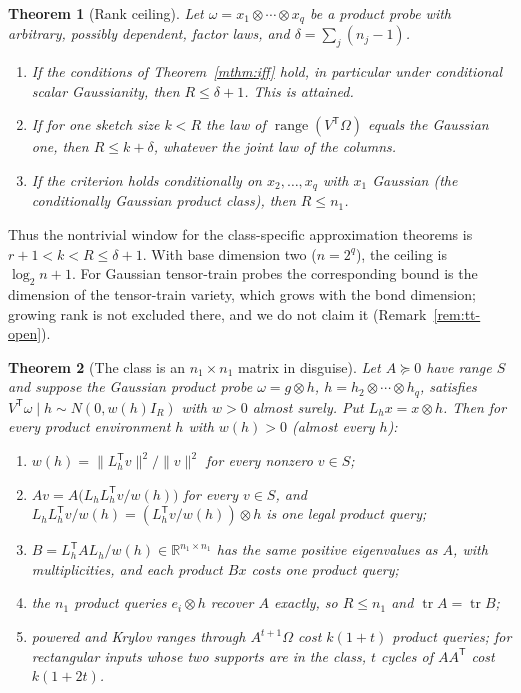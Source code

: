 \documentclass[11pt,a4paper]{article}
\newtheorem{mainthm}{Theorem}
\theoremstyle{definition}
\theoremstyle{remark}
\numberwithin{equation}{section}
\newcommand{\R}{\mathbb R}
\newcommand{\T}{{\mathsf T}}
\newcommand{\tr}{\operatorname{tr}}
\newcommand{\range}{\operatorname{range}}
\newcommand{\norm}[1]{\lVert#1\rVert}
\begin{document}
\begin{mainthm}[Rank ceiling]\label{mthm:ceiling}
Let $\omega=x_1\otimes\cdots\otimes x_q$ be a product probe with arbitrary,
possibly dependent, factor laws, and $\delta=\sum_j(n_j-1)$.
\begin{enumerate}[label=\textup{(\roman*)}]
\item If the conditions of Theorem~\ref{mthm:iff} hold, in particular under
      conditional scalar Gaussianity, then $R\le\delta+1$. This is attained.
\item If for one sketch size $k<R$ the law of $\range(V^\T\Omega)$ equals the
      Gaussian one, then $R\le k+\delta$, whatever the joint law of the columns.
\item If the criterion holds conditionally on $x_2,\ldots,x_q$ with $x_1$
      Gaussian (the conditionally Gaussian product class), then $R\le n_1$.
\end{enumerate}
\end{mainthm}

Thus the nontrivial window for the class-specific approximation theorems is
$r+1<k<R\le\delta+1$. With base dimension two ($n=2^q$), the ceiling is
$\log_2 n+1$. For Gaussian tensor-train probes the corresponding bound is the
dimension of the tensor-train variety, which grows with the bond dimension;
growing rank is not excluded there, and we do not claim it
(Remark~\ref{rem:tt-open}).

\begin{mainthm}[The class is an $n_1\times n_1$ matrix in disguise]
\label{mthm:reduction}
Let $A\succeq0$ have range $S$ and suppose the Gaussian product probe
$\omega=g\otimes h$, $h=h_2\otimes\cdots\otimes h_q$, satisfies
$V^\T\omega\mid h\sim N(0,w(h)I_R)$ with $w>0$ almost surely. Put
$L_h x=x\otimes h$. Then for \emph{every} product environment $h$ with
$w(h)>0$ (almost every $h$):
\begin{enumerate}[label=\textup{(\alph*)}]
\item $w(h)=\norm{L_h^\T v}^2/\norm v^2$ for every nonzero $v\in S$;
\item $Av=A\bigl(L_hL_h^\T v/w(h)\bigr)$ for every $v\in S$, and
      $L_hL_h^\T v/w(h)=(L_h^\T v/w(h))\otimes h$ is one legal product query;
\item $B=L_h^\T AL_h/w(h)\in\R^{n_1\times n_1}$ has the same positive
      eigenvalues as $A$, with multiplicities, and each product $Bx$ costs one
      product query;
\item the $n_1$ product queries $e_i\otimes h$ recover $A$ exactly, so
      $R\le n_1$ and $\tr A=\tr B$;
\item powered and Krylov ranges through $A^{t+1}\Omega$ cost $k(1+t)$ product
      queries; for rectangular inputs whose two supports are in the class,
      $t$ cycles of $AA^\T$ cost $k(1+2t)$.
\end{enumerate}
\end{mainthm}
\end{document}
